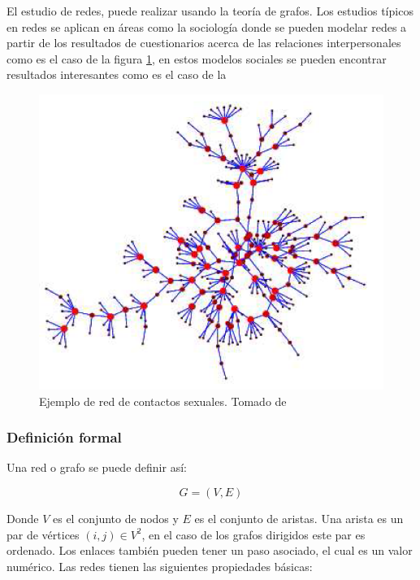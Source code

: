 El estudio de redes, puede realizar usando la teoría de grafos. Los estudios típicos en redes se aplican en áreas como la sociología donde se pueden modelar redes a partir de los resultados de cuestionarios acerca de las relaciones interpersonales como es el caso de la figura \ref{fig:contactosSexuales}, en estos modelos sociales se pueden encontrar resultados interesantes como es el caso de la

\begin{figure}[H]
    \centering
    \includegraphics[scale=0.4]{Capitulo2EstadoDelArte/imagenes/contactos.png}
    \caption{Ejemplo de red de contactos sexuales. Tomado de \cite{Newman2003}}
    \label{fig:contactosSexuales}
\end{figure}

\subsubsection{Definición formal}

Una red o grafo se puede definir así:

\begin{equation}
    G = (V,E)
\end{equation}

Donde $V$ es el conjunto de nodos y $E$ es el conjunto de aristas. Una arista es un par de vértices $(i,j)\in V^2$, en el caso de los grafos dirigidos este par es ordenado. Los enlaces también pueden tener un paso asociado, el cual es un valor numérico. Las redes tienen las siguientes propiedades básicas:

